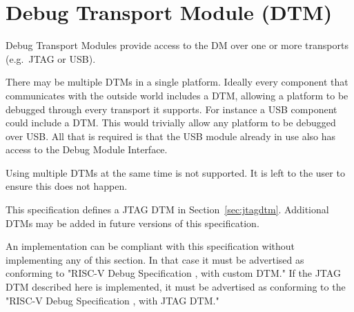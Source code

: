 \chapter{Debug Transport Module (DTM)} \label{dtm}

Debug Transport Modules provide access to the DM over one or more transports
(e.g.\ JTAG or USB).

There may be multiple DTMs in a single platform. Ideally every component that
communicates with the outside world includes a DTM, allowing a platform to be
debugged through every transport it supports.  For instance a USB component
could include a DTM. This would trivially allow any platform to be debugged
over USB. All that is required is that the USB module already in use also has
access to the Debug Module Interface.

Using multiple DTMs at the same time is not supported. It is left to the user
to ensure this does not happen.

This specification defines a JTAG DTM in Section~\ref{sec:jtagdtm}. Additional DTMs
may be added in future versions of this specification.

An implementation can be compliant with this specification without implementing
any of this section. In that case it must be advertised as conforming to
"RISC-V Debug Specification \versionnum, with custom DTM." If the JTAG DTM
described here is implemented, it must be advertised as conforming to the
"RISC-V Debug Specification \versionnum, with JTAG DTM."


